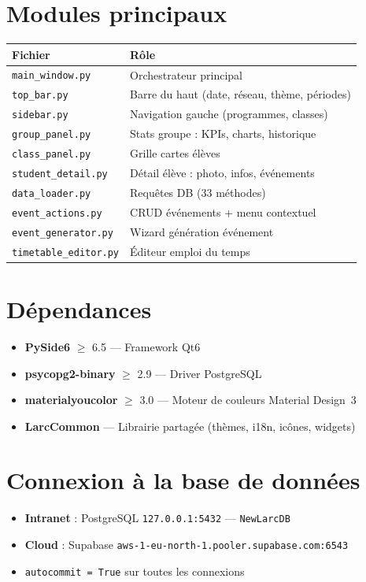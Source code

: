 \documentclass[11pt,a4paper]{article}
\begin{document}
\section{Modules principaux}

\begin{center}
\begin{tabular}{|l|l|}
\hline
\textbf{Fichier} & \textbf{Rôle} \\ \hline
    \texttt{main\_window.py} & Orchestrateur principal \\ \hline
    \texttt{top\_bar.py} & Barre du haut (date, réseau, thème, périodes) \\ \hline
    \texttt{sidebar.py} & Navigation gauche (programmes, classes) \\ \hline
    \texttt{group\_panel.py} & Stats groupe : KPIs, charts, historique \\ \hline
    \texttt{class\_panel.py} & Grille cartes élèves \\ \hline
    \texttt{student\_detail.py} & Détail élève : photo, infos, événements \\ \hline
    \texttt{data\_loader.py} & Requêtes DB (33 méthodes) \\ \hline
    \texttt{event\_actions.py} & CRUD événements + menu contextuel \\ \hline
    \texttt{event\_generator.py} & Wizard génération événement \\ \hline
    \texttt{timetable\_editor.py} & Éditeur emploi du temps \\ \hline
\end{tabular}
\end{center}

\section{Dépendances}

\begin{itemize}
  \item \textbf{PySide6} $\ge$ 6.5 — Framework Qt6
  \item \textbf{psycopg2-binary} $\ge$ 2.9 — Driver PostgreSQL
  \item \textbf{materialyoucolor} $\ge$ 3.0 — Moteur de couleurs Material Design~3
  \item \textbf{LarcCommon} — Librairie partagée (thèmes, i18n, icônes, widgets)
\end{itemize}

\section{Connexion à la base de données}

\begin{itemize}
  \item \textbf{Intranet} : PostgreSQL \texttt{127.0.0.1:5432} — \texttt{NewLarcDB}
  \item \textbf{Cloud} : Supabase \texttt{aws-1-eu-north-1.pooler.supabase.com:6543}
  \item \texttt{autocommit = True} sur toutes les connexions
\end{itemize}
\end{document}
